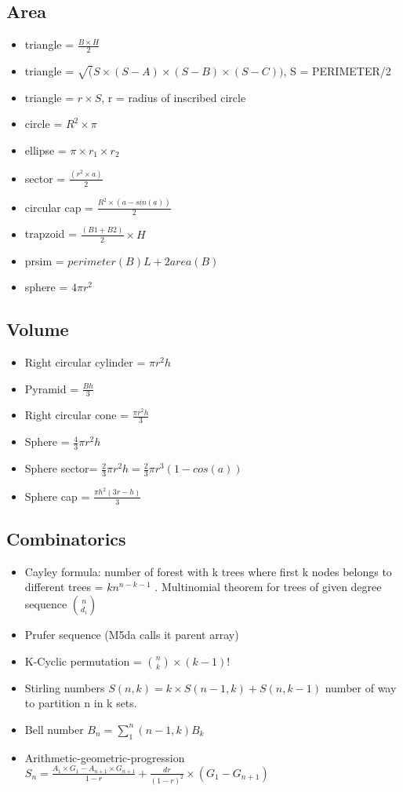 \subsection{Area}
\begin{itemize}
\item triangle = $\frac{B \times H}{2}$
\item triangle = $\sqrt(S \times (S-A) \times (S-B) \times (S-C))$, S = PERIMETER/2
\item triangle = $r \times S$, r = radius of inscribed circle
\item circle = $R^2 \times \pi$
\item ellipse = $\pi \times r_1 \times r_2$
\item sector = $\frac{(r^2 \times a)}{2}$
\item circular cap = $\frac{R^2 \times (a-sin(a))}{2}$
\item trapzoid = $\frac{(B1 + B2)}{2} \times H$
\item prsim = $perimeter(B) L + 2 area(B)$
\item sphere = $4 \pi r^2$
\end{itemize}
\hrulefill
\subsection{Volume}
\begin{itemize}
\item Right circular cylinder = $\pi r^2 h$ 
\item Pyramid = $\frac{Bh}{3}$
\item Right circular cone = $\frac{\pi r^2 h}{3}$
\item Sphere = $\frac{4}{3} \pi r^2 h$
\item Sphere sector= $\frac{2}{3} \pi r^2h = \frac{2}{3} \pi r^3 (1-cos(a))$
\item Sphere cap = $\frac{\pi h^2 (3r-h)}{3}$
\end{itemize}
\hrulefill
\subsection{Combinatorics}
\begin{itemize}
\item Cayley formula: number of forest with k trees where first k nodes belongs to different trees = $k n^{n-k-1}$ . Multinomial theorem for trees of given degree sequence ${\binom{n}{d_i}}$
\item Prufer sequence (M5da calls it parent array)
\item  K-Cyclic permutation = ${\binom{n}{k}} \times (k-1)!$
\item Stirling numbers $S(n,k) = k \times S(n-1,k) + S(n,k-1)$ number of way to partition n in k sets.
\item Bell number $B_n = \sum_1^n (n-1, k) B_k$ 
\item Arithmetic-geometric-progression $S_n = \frac{A_1 \times G_1 - A_{n+1} \times G_{n+1}}{1-r} + \frac{dr}{(1-r)^2} \times (G_1-G_{n+1})$
\end{itemize}
\hrulefill
